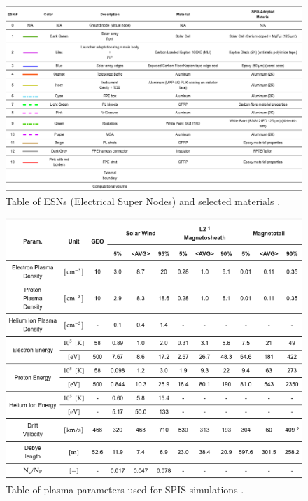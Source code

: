 \documentclass[12pt]{article}
\begin{document}
\begin{figure}[H]
    \centering
    \includegraphics[width=\textwidth]{materials ariel autoCAD.png}
    \caption{\centering Table of ESNs (Electrical Super Nodes) and selected materials \protect\cite{Michelagnoli_Focardi_Pudney_Renouf_Merola_Noce_Nunez_Dinuzzi_Chiarucci_2024}.}
    \label{fig:13}
\end{figure}

\begin{figure}[H]
    \centering
    \includegraphics[width=.7\textwidth]{ariel plasma param.png}
    \caption{\centering Table of plasma parameters used for SPIS simulations \protect\cite{Michelagnoli_Focardi_Pudney_Renouf_Merola_Noce_Nunez_Dinuzzi_Chiarucci_2024}.}
    \label{fig:14}
\end{figure}

\listoffigures

\listoftables
\end{document}
